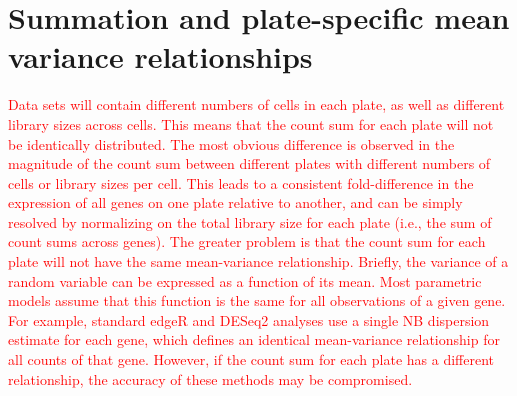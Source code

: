 \documentclass{article}
\newcommand\revised[1]{\textcolor{red}{#1}}
\begin{document}
\section{Summation and plate-specific mean variance relationships}
\revised{Data sets will contain different numbers of cells in each plate, as well as different library sizes across cells.
This means that the count sum for each plate will not be identically distributed.
The most obvious difference is observed in the magnitude of the count sum between different plates with different numbers of cells or library sizes per cell.
This leads to a consistent fold-difference in the expression of all genes on one plate relative to another, and can be simply resolved by normalizing on the total library size for each plate (i.e., the sum of count sums across genes).
The greater problem is that the count sum for each plate will not have the same mean-variance relationship.
Briefly, the variance of a random variable can be expressed as a function of its mean.
Most parametric models assume that this function is the same for all observations of a given gene.
For example, standard edgeR and DESeq2 analyses use a single NB dispersion estimate for each gene, which defines an identical mean-variance relationship for all counts of that gene.
However, if the count sum for each plate has a different relationship, the accuracy of these methods may be compromised.}
\end{document}
